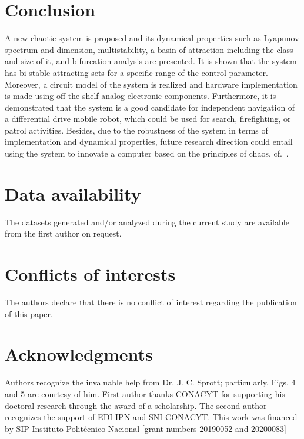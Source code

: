 \documentclass[final,5p,times,twocolumn]{elsarticle}
\begin{document}
\section{Conclusion}
A new chaotic system is proposed and its dynamical properties such as Lyapunov spectrum and dimension, multistability, a basin of attraction including the class and size of it, and bifurcation analysis are presented. It is shown that the system has bi-stable attracting sets for a specific range of the control parameter. Moreover, a circuit model of the system is realized and hardware implementation is made using off-the-shelf analog electronic components. Furthermore, it is demonstrated that the system is a good candidate for independent navigation of a differential drive mobile robot, which could be used for search, firefighting, or patrol activities. Besides, due to the robustness of the system in terms of implementation and dynamical properties, future research direction could entail using the system to innovate a computer based on the principles of chaos, cf.~\cite{pappu2020simultaneous}.
\section*{Data availability}
The datasets generated and/or analyzed during the current study are available from the first author on request.	
\section*{Conflicts of interests}
The authors declare that there is no conflict of interest regarding the publication of this paper.	
\section*{Acknowledgments}
Authors recognize the invaluable help from Dr. J. C. Sprott; particularly, Figs. 4 and 5 are courtesy of him. First author thanks CONACYT for supporting his doctoral research through the award of a scholarship. The second author recognizes the support of EDI-IPN and SNI-CONACYT. This work was financed by SIP Instituto Politécnico Nacional [grant numbers 20190052 and 20200083]



 






\end{document}
